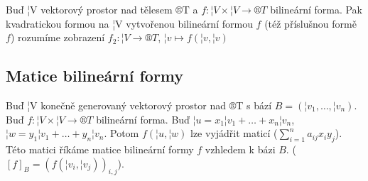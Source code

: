 \documentclass[12pt]{article}                   %
\begin{document}
    \begin{definice}
        Buď ¦V vektorový prostor nad tělesem ®T a $f: ¦V \times ¦V \rightarrow ®T$ bilineární forma. Pak kvadratickou formou na ¦V vytvořenou bilineární formou $f$ (též příslušnou formě $f$) rozumíme zobrazení $f_2: ¦V \rightarrow ®T$, $¦v \mapsto f(¦v, ¦v)$
    \end{definice}

    \subsection{Matice bilineární formy}
        \begin{definice}
            Buď ¦V konečně generovaný vektorový prostor nad ®T s bází $B = (¦v_1, …, ¦v_n)$. Buď $f: ¦V \times ¦V \rightarrow ®T$ bilineární forma. Buď $¦u = x_1¦v_1 + … + x_n¦v_n$, $¦w = y_1¦v_1 + … +y_n¦v_n$. Potom $f(¦u, ¦w)$ lze vyjádřit maticí ($\sum_{i=1}^na_{ij}x_iy_j$). Této matici říkáme matice bilineární formy $f$ vzhledem k bázi $B$. ($[f]_B = (f(¦v_i, ¦v_j))_{i, j}$).
        \end{definice}
\end{document}
